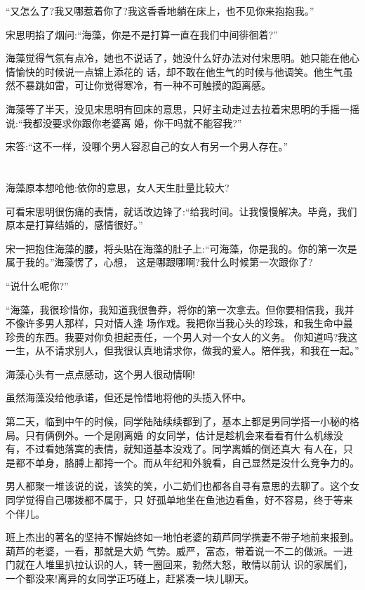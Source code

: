 \documentclass[11pt,a4paper,onecolumn]{article}
\begin{document}
``又怎么了?我又哪惹着你了?我这香香地躺在床上，也不见你来抱抱我。''

宋思明掐了烟问:``海藻，你是不是打算一直在我们中间徘徊着?''

海藻觉得气氛有点冷，她也不说话了，她没什么好办法对付宋思明。她只能在他心情愉快的时候说一点锦上添花的
话，却不敢在他生气的时候与他调笑。他生气虽然不暴跳如雷，可让你觉得寒冷，有一种不可触摸的距离感。

海藻等了半天，没见宋思明有回床的意思，只好主动走过去拉着宋思明的手摇一摇说:``我都没要求你跟你老婆离
婚，你干吗就不能容我?''

宋答:``这不一样，没哪个男人容忍自己的女人有另一个男人存在。''

\section[\thesection]{}

海藻原本想呛他:依你的意思，女人天生肚量比较大?

可看宋思明很伤痛的表情，就话改边锋了:``给我时间。让我慢慢解决。毕竟，我们原本是打算结婚的，感情很好。''

宋一把抱住海藻的腰，将头贴在海藻的肚子上:``可海藻，你是我的。你的第一次是属于我的。''海藻愣了，心想，
这是哪跟哪啊?我什么时候第一次跟你了?

``说什么呢你?''

``海藻，我很珍惜你，我知道我很鲁莽，将你的第一次拿去。但你要相信我，我并不像许多男人那样，只对情人逢
场作戏。我把你当我心头的珍珠，和我生命中最珍贵的东西。我要对你负担起责任，一个男人对一个女人的义务。
你知道吗?我这一生，从不请求别人，但我很认真地请求你，做我的爱人。陪伴我，和我在一起。''

海藻心头有一点点感动，这个男人很动情啊!

虽然海藻没给他承诺，但还是怜惜地将他的头揽入怀中。

第二天，临到中午的时候，同学陆陆续续都到了，基本上都是男同学搭一小秘的格局。只有俩例外。一个是刚离婚
的女同学，估计是趁机会来看看有什么机缘没有，不过看她落寞的表情，就知道基本没戏了。同学离婚的倒还真大
有人在，只是都不单身，胳膊上都挎一个。而从年纪和外貌看，自己显然是没什么竞争力的。

男人都聚一堆该说的说，该笑的笑，小二奶们也都各自寻有意思的去聊了。这个女同学觉得自己哪拨都不属于，只
好孤单地坐在鱼池边看鱼，好不容易，终于等来个伴儿。

班上杰出的著名的坚持不懈始终如一地怕老婆的葫芦同学携妻不带子地前来报到。葫芦的老婆，一看，那就是大奶
气势。威严，富态，带着说一不二的做派。一进门就在人堆里扒拉认识的人，转一圈回来，勃然大怒，敢情以前认
识的家属们，一个都没来!离异的女同学正巧碰上，赶紧凑一块儿聊天。
\end{document}
